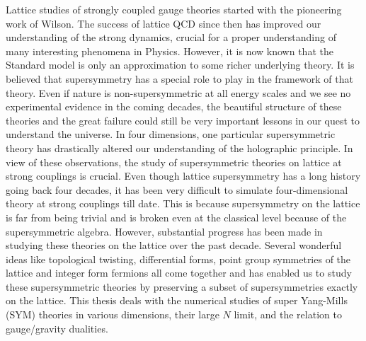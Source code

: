 Lattice studies of strongly coupled gauge theories started with the pioneering work of 
Wilson. The success of lattice QCD since then has improved our understanding of the strong dynamics, 
crucial for a proper understanding of many interesting phenomena in Physics. However, it is now known that the 
Standard model is only an approximation to some richer underlying theory. It is
believed that supersymmetry has a special role to play in the framework of that theory. 
Even if nature is non-supersymmetric at all energy scales and we see no experimental evidence 
in the coming decades, the beautiful structure of these theories
and the great failure could still be very important lessons in our quest to understand the universe. 
In four dimensions, one particular supersymmetric theory has drastically altered our understanding 
of the holographic principle. In view of these observations, the study of supersymmetric
theories on lattice at strong couplings is crucial. Even though lattice supersymmetry has a long history 
going back four decades, it has been very difficult to simulate four-dimensional theory at strong
couplings till date. This is because supersymmetry on the lattice is far from being trivial and is broken 
even at the classical level because of the supersymmetric algebra.
However, substantial progress has been made in studying these theories on the lattice over the
past decade. Several wonderful ideas like topological twisting, differential forms, point group 
symmetries of the lattice and integer form fermions all come together and has enabled us to study
 these supersymmetric theories by preserving a subset of supersymmetries exactly on the lattice. 
This thesis deals with the numerical studies of super Yang-Mills (SYM) theories in various dimensions, 
their large $N$ limit, and the relation to gauge/gravity dualities. 
